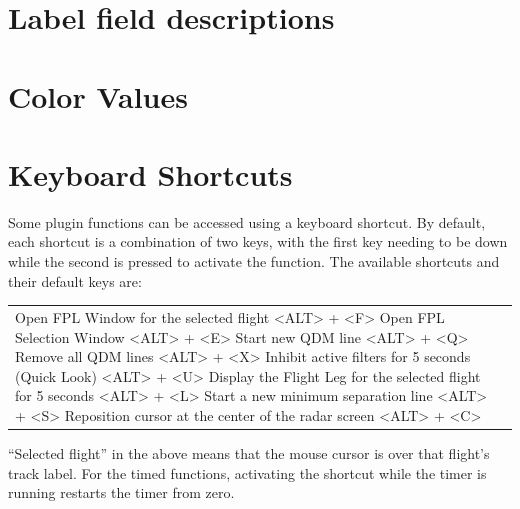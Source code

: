 \documentclass[11pt,a4paper,oldfontcommands]{memoir}
\begin{document}
\appendix

\chapter{Label field descriptions}

\chapter{Color Values}

\chapter{Keyboard Shortcuts}

Some plugin functions can be accessed using a keyboard shortcut. By default, each shortcut is a combination of two keys, with the first key needing to be down while the second is pressed to activate the function. The available shortcuts and their default keys are:

\begin{tabular}{l l}
    Open FPL Window for the selected flight                         <ALT> + <F>
    Open FPL Selection Window                                       <ALT> + <E>
    Start new QDM line                                              <ALT> + <Q>
    Remove all QDM lines                                            <ALT> + <X>
    Inhibit active filters for 5 seconds (Quick Look)               <ALT> + <U>
    Display the Flight Leg for the selected flight for 5 seconds    <ALT> + <L>
    Start a new minimum separation line                             <ALT> + <S>
    Reposition cursor at the center of the radar screen             <ALT> + <C>    
\end{tabular}

“Selected flight” in the above means that the mouse cursor is over that flight’s track label. For the timed functions, activating the shortcut while the timer is running restarts the timer from zero.




\end{document}
